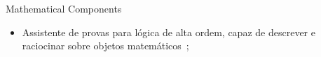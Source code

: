 \begin{frame}{Mathematical Components}
    \begin{itemize}
        \item Assistente de provas para lógica de alta ordem, capaz de descrever e raciocinar sobre objetos matemáticos~\cite{geuvers2009proof};
    \end{itemize}
\end{frame}